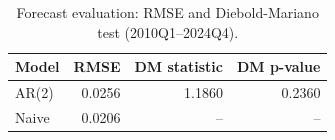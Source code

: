 \begin{table}[H]
  \centering
  \caption{Forecast evaluation: RMSE and Diebold-Mariano test (2010Q1--2024Q4).}
  \label{tab:forecast_eval}
  \begin{tabular}{lrrr}
  \toprule
  Model & RMSE & DM statistic & DM p-value \\
  \midrule
  AR(2) & 0.0256 & 1.1860 & 0.2360 \\
  Naive & 0.0206 & -- & -- \\
  \bottomrule
  \end{tabular}
\end{table}

